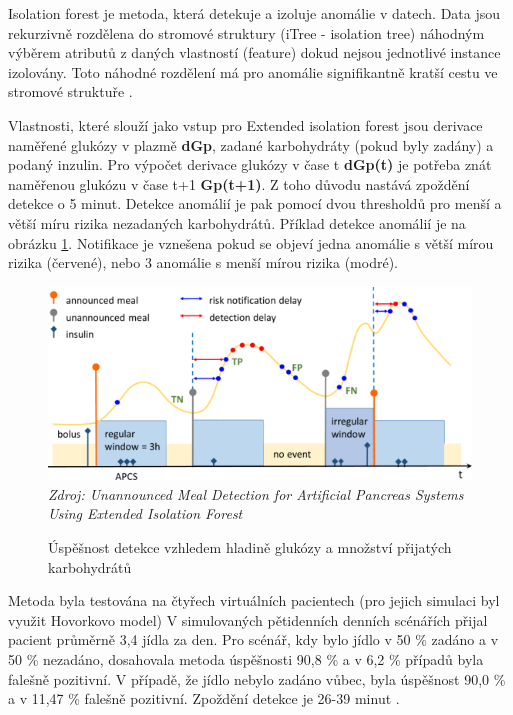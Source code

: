 Isolation forest je metoda, která detekuje a izoluje anomálie v datech. Data jsou rekurzivně rozdělena do stromové struktury (iTree - isolation tree) náhodným výběrem atributů z daných vlastností (feature) dokud nejsou jednotlivé instance izolovány. Toto náhodné rozdělení má pro anomálie signifikantně kratší cestu ve stromové struktuře \citep{analyzaCHO.IsolationForest}.

Vlastnosti, které slouží jako vstup pro Extended isolation forest \citep{analyzaCHO.ExtendedIsolationForest} jsou derivace naměřené glukózy v plazmě \textbf{dGp}, zadané karbohydráty (pokud byly zadány) a podaný inzulin. Pro výpočet derivace glukózy v čase t \textbf{dGp(t)} je potřeba znát naměřenou glukózu v čase t+1 \textbf{Gp(t+1)}. Z toho důvodu nastává zpoždění detekce o 5 minut. Detekce anomálií je pak pomocí dvou thresholdů pro menší a větší míru rizika nezadaných karbohydrátů.
Příklad detekce anomálií je na obrázku \ref{fig:analyza:forest}. Notifikace je vznešena pokud se objeví jedna anomálie s větší mírou rizika (červené), nebo 3 anomálie s menší mírou rizika (modré).

\begin{figure}[H]
\caption{Úspěšnost detekce vzhledem hladině glukózy a množství přijatých karbohydrátů}
\label{fig:analyza:forest}
\includegraphics[width=1\textwidth]{img/analyzaCHO/forest.png}\\
\textit{Zdroj: Unannounced Meal Detection for Artificial Pancreas Systems Using Extended Isolation Forest \citep{analyzaCHO.ExtendedIsolationForest}}
\end{figure}

Metoda byla testována na čtyřech virtuálních pacientech (pro jejich simulaci byl využit Hovorkovo model) V simulovaných pětidenních denních scénářích přijal pacient průměrně 3,4 jídla za den. Pro scénář, kdy bylo jídlo v 50 \% zadáno a v 50 \% nezadáno, dosahovala metoda úspěšnosti 90,8 \% a v 6,2 \% případů byla falešně pozitivní. V případě, že jídlo nebylo zadáno vůbec, byla úspěšnost 90,0 \% a v 11,47 \% falešně pozitivní. Zpoždění detekce je 26-39 minut \citep{analyzaCHO.ExtendedIsolationForest}.


